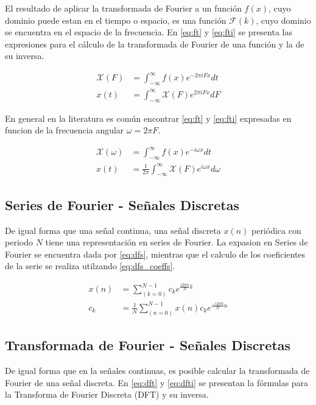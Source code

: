 \documentclass[
  letterpaper,
  twocolumn,
  9pt,
  journal,
  final]{IEEEtran}
\begin{document}
El resultado de aplicar la transformada de Fourier a un función $f(x)$, cuyo dominio puede estan en el tiempo o espacio, es una función $\mathcal{F}(k)$, cuyo dominio se encuentra en el espacio de la frecuencia. En \ref{eq:ft} y \ref{eq:fti} se presenta las expresiones para el cálculo de la transformada de Fourier de una función y la de su inversa.

\begin{align}
	\mathcal{X}(F) &= \int_{-\infty}^{\infty} f(x) e^{-2\pi i F x} dt \label{eq:ft}\\
	x(t) &= \int_{-\infty}^{\infty} \mathcal{X}(F) e^{ 2\pi i F x} dF \label{eq:fti}
\end{align}

En general en la literatura es común encontrar \ref{eq:ft} y \ref{eq:fti} expresadas en funcion de la frecuencia angular $\omega = 2\pi F$.

\begin{align}
	\mathcal{X}(\omega) &= \int_{-\infty}^{\infty} f(x) e^{-i \omega x} dt \label{eq:ft}\\
	x(t) &= \frac{1}{2\pi} \int_{-\infty}^{\infty} \mathcal{X}(F) e^{i \omega x} d\omega \label{eq:fti}
\end{align}

\subsection{Series de Fourier - Señales Discretas}

De igual forma que una señal continua, una señal discreta $x(n)$ periódica con periodo $N$ tiene una representación en series de Fourier. La expasion en Series de Fourier se encuentra dada por \ref{eq:dfs}, mientras que el calculo de los coeficientes de la serie se realiza utilzando \ref{eq:dfs_coeffs}.

\begin{align}
	x(n) &= \sum_(k=0)^{N-1} c_k e^{\frac{i 2 \pi n}{N} k } \label{eq:dfs} \\
	c_k &= \frac{1}{N} \sum_(n=0)^{N-1} x(n) c_k e^{\frac{-i 2 \pi k}{N} n} \label{eq:dfs_coeffs}
\end{align}


\subsection{Transformada de Fourier - Señales Discretas}

De igual forma que en la señales continuas, es posible calcular la transformada de Fourier de una señal discreta. En \ref{eq:dft}  y  \ref{eq:dfti} se presentan la fórmulas para la Transforma de Fourier Discreta (DFT) y su inversa.
\end{document}
